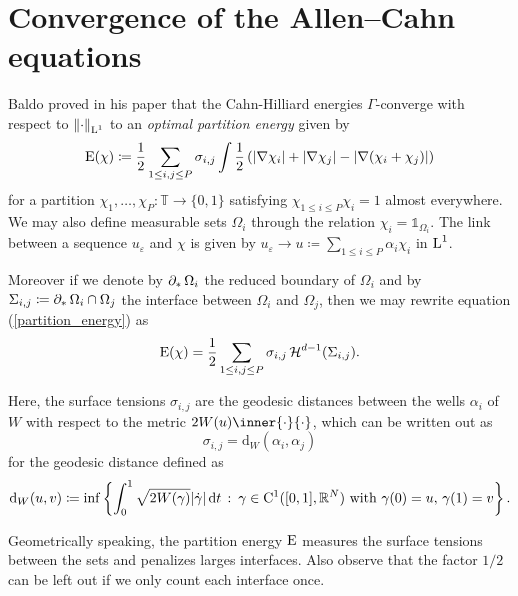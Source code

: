 \chapter{Convergence of the Allen--Cahn equations}

Baldo proved in his paper \cite{baldo_minimal_interface_criterion} that the Cahn-Hilliard energies $ \Gamma $-converge with respect to $ \norm{ \cdot }_{\operatorname{L}^{ 1 }} $ to an \emph{optimal partition energy} given by
\begin{equation}
	\label{partition_energy}
	\operatorname{E} ( \chi ) 
	\coloneqq
	\frac{ 1 }{ 2 }
	\sum_{ 1 \leq i, j \leq P }
	\sigma_{ i , j }
	\int
	\frac{ 1 }{ 2 }
	\left(
	\abs{ \nabla \chi_{ i } }
	+
	\abs{ \nabla \chi_{ j } }
	-
	\abs{ \nabla ( \chi_{ i } + \chi_{ j } ) }
	\right)
\end{equation}
for a partition $ \chi_{ 1 }, \dotsc, \chi_{ P } \colon \mathbb{ T } \to \{ 0, 1 \} $ satisfying $ \chi_{ 1 \leq i \leq P } \chi_{ i } = 1 $ almost everywhere. We may also define measurable sets $ \Omega_{ i } $ through the relation $ \chi_{ i } = \mathds{1}_{ \Omega_{ i } }  $. The link between a sequence $ u_{ \varepsilon} $ and $ \chi $ is given by $ u_{ \varepsilon} \to u \coloneqq \sum_{ 1 \leq i \leq P } \alpha_{ i } \chi_{ i } $ in $ \operatorname{L}^{ 1 } $. 

Moreover if we denote by $ \operatorname{\partial_{ \ast }} \Omega_{ i } $ the reduced boundary of $ \Omega_{ i } $ and by $ \Sigma_{ i , j } \coloneqq \operatorname{\partial_{ \ast }} \Omega_{ i } \cap \Omega_{ j } $ the interface between $ \Omega_{ i } $ and $ \Omega_{ j } $, then we may rewrite equation (\ref{partition_energy}) as 
\begin{equation*}
	\operatorname{E} ( \chi ) 
	=
	\frac{ 1 }{ 2 }
	\sum_{1 \leq i, j \leq P }
	\sigma_{ i , j } \operatorname{\mathcal{H}}^{ d - 1 } ( \Sigma_{ i , j } ).
\end{equation*}

Here, the surface tensions $ \sigma_{ i , j } $ are the geodesic distances between the wells $ \alpha_{ i } $ of $ W $ with respect to the metric $ 2W(u) \inner{\cdot}{\cdot} $, which can be written out as
\begin{equation*}
	\sigma_{ i , j } = \mathrm{ d }_{ W } ( \alpha_{ i } , \alpha_{ j } )
\end{equation*}
for the geodesic distance defined as
\begin{equation}
	\mathrm{ d }_{ W } ( u, v )
	\coloneqq
	\inf
	\left\{
	\int_{ 0 }^{ 1 }
	\sqrt{ 2 W ( \gamma ) }
	\abs{ \dot{ \gamma }  }
	\dd{t}
	\,
	\colon
	\, \gamma \in \mathrm{ C }^{ 1 }( [0, 1 ], \mathbb{ R }^{ N } ) \text{ with } \gamma( 0 ) = u,\, \gamma( 1 )= v 
	\right\}.
\end{equation}

Geometrically speaking, the partition energy $ \operatorname{E} $ measures the surface tensions between the sets and penalizes larges interfaces. Also observe that the factor $ 1/2 $ can be left out if we only count each interface once.